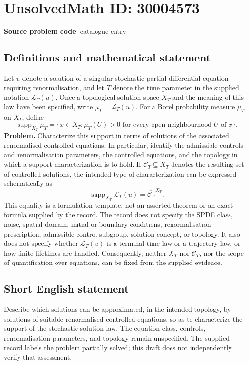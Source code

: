 \documentclass[11pt]{article}
\begin{document}
\section*{UnsolvedMath ID: 30004573}
\textbf{Source problem code:} catalogue entry
\subsection{Definitions and mathematical statement}
Let \(u\) denote a solution of a singular stochastic partial differential equation requiring renormalisation, and let \(T\) denote the time parameter in the supplied notation \(\mathcal{L}_T(u)\). Once a topological solution space \(X_T\) and the meaning of this law have been specified, write \(\mu_T=\mathcal{L}_T(u)\). For a Borel probability measure \(\mu_T\) on \(X_T\), define
\[
\operatorname{supp}_{X_T}\mu_T
=\{x\in X_T: \mu_T(U)>0\text{ for every open neighbourhood }U\text{ of }x\}.
\]
\textbf{Problem.} Characterize this support in terms of solutions of the associated renormalised controlled equations. In particular, identify the admissible controls and renormalisation parameters, the controlled equations, and the topology in which a support characterization is to hold. If \(\mathcal{C}_T\subseteq X_T\) denotes the resulting set of controlled solutions, the intended type of characterization can be expressed schematically as
\[
\operatorname{supp}_{X_T}\mathcal{L}_T(u)
=\overline{\mathcal{C}_T}^{\,X_T}.
\]
This equality is a formulation template, not an asserted theorem or an exact formula supplied by the record. The record does not specify the SPDE class, noise, spatial domain, initial or boundary conditions, renormalisation prescription, admissible control subgroup, solution concept, or topology. It also does not specify whether \(\mathcal{L}_T(u)\) is a terminal-time law or a trajectory law, or how finite lifetimes are handled. Consequently, neither \(X_T\) nor \(\mathcal{C}_T\), nor the scope of quantification over equations, can be fixed from the supplied evidence.
\subsection{Short English statement}
Describe which solutions can be approximated, in the intended topology, by solutions of suitable renormalised controlled equations, so as to characterize the support of the stochastic solution law. The equation class, controls, renormalisation parameters, and topology remain unspecified. The supplied record labels the problem partially solved; this draft does not independently verify that assessment.
\end{document}

